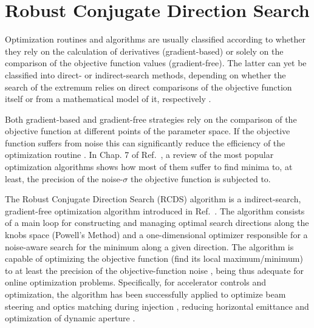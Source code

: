 





\section{Robust Conjugate Direction Search}
Optimization routines and algorithms are usually classified according to whether they rely on the calculation of derivatives (gradient-based) or solely on the comparison of the objective function values (gradient-free). The latter can yet be classified into direct- or indirect-search methods, depending on whether the search of the extremum relies on direct comparisons of the objective function itself or from a mathematical model of it, respectively \cite{numerical_recipes}.

Both gradient-based and gradient-free strategies rely on the comparison of the objective function at different points of the parameter space. If the objective function suffers from noise this can significantly reduce the efficiency of the optimization routine \cite{numerical_recipes, huang2019beam}. In Chap. 7 of Ref.~\cite{huang2019beam}, a review of the most popular optimization algorithms shows how most of them suffer to find minima to, at least, the precision of the noise-$\sigma$ the objective function is subjected to.

The Robust Conjugate Direction Search (RCDS) algorithm is a indirect-search, gradient-free optimization algorithm introduced in Ref.~\cite{Huang:2013}. The algorithm consists of a main loop for constructing and managing optimal search directions along the knobs space (Powell's Method) and a one-dimensional optimizer responsible for a noise-aware search for the minimum along a given direction. The algorithm is capable of optimizing the objective function (find its local maximum/minimum) to at least the precision of the objective-function noise \cite{Huang:2013, huang2019beam}, being thus adequate for online optimization problems. Specifically, for accelerator controls and optimization, the algorithm has been successfully applied to optimize beam steering and optics matching during injection \cite{Huang:2013}, reducing horizontal emittance \cite{Huang:2013, Huang:2015}and optimization of dynamic aperture \cite{Huang:2013,Huang:2015,Liuzzo:IPAC2016-THPMR015,Olsson:IPAC2018-WEPAL047,yang:ipac2022-tupopt064}.

